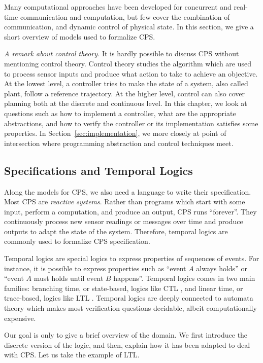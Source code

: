 \documentclass[
graybox,
envcountchap
]{svmult}
\begin{document}
\begin{bibunit}
Many computational approaches have been developed for concurrent and real-time communication and computation, but few cover the combination of communication, and dynamic control of physical state.
In this section, we give a short overview of models used to formalize CPS.

\emph{A remark about control theory.}
It is hardly possible to discuss CPS without mentioning control theory.
Control theory studies the algorithm which are used to process sensor inputs and produce what action to take to achieve an objective.
At the lowest level, a controller tries to make the state of a system, also called plant, follow a reference trajectory.
At the higher level, control can also cover planning both at the discrete and continuous level.
In this chapter, we look at questions such as how to implement a controller, what are the appropriate abstractions, and how to verify the controller or its implementation satisfies some properties.
In Section~\ref{sec:implementation}, we more closely at point of intersection where programming abstraction and control techniques meet.


\subsection{Specifications and Temporal Logics}

Along the models for CPS, we also need a language to write their specification.
Most CPS are \emph{reactive systems}.
Rather than programs which start with some input, perform a computation, and produce an output, CPS runs ``forever''.
They continuously process new sensor readings or messages over time and produce outputs to adapt the state of the system.
Therefore, temporal logics are commonly used to formalize CPS specification.

Temporal logics are special logics to express properties of sequences of events.
For instance, it is possible to express properties such as ``event $A$ always holds'' or ``event $A$ must holds until event $B$ happens''.
Temporal logics comes in two main families:
    branching time, or state-based, logics like CTL \cite{DBLP:conf/lop/ClarkeE81}, and
    linear time, or trace-based, logics like LTL \cite{DBLP:conf/focs/Pnueli77}.
Temporal logics are deeply connected to automata theory which makes most verification questions decidable, albeit computationally expensive.

Our goal is only to give a brief overview of the domain.
We first introduce the discrete version of the logic, and then, explain how it has been adapted to deal with CPS.
Let us take the example of LTL.


\end{bibunit}
\end{document}
